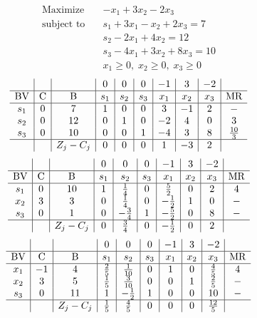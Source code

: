 \documentclass{article}
\begin{document}
\begin{align*}
\text{Maximize} \quad & -x_{1} + 3x_{2} - 2x_{3}\\
\text{subject to} \quad
& s_{1} + 3x_{1} - x_{2} + 2x_{3}=7\\
& s_{2} - 2x_{1} + 4x_{2}=12\\
& s_{3} - 4x_{1} + 3x_{2} + 8x_{3}=10\\
& x_{1}\ge0,\; x_{2}\ge0,\; x_{3}\ge0\end{align*}
\begin{align*}
\begin{array}{c|c|c|c|c|c|c|c|c|c}
 &  &  & 0 & 0 & 0 & -1 & 3 & -2 & \\
\hline
\text{BV} & \text{C} & \text{B} & s_{1} & s_{2} & s_{3} & x_{1} & x_{2} & x_{3} & \text{MR} \\
\hline
s_{1} & 0 & 7 & 1 & 0 & 0 & 3 & -1 & 2 & - \\
s_{2} & 0 & 12 & 0 & 1 & 0 & -2 & 4 & 0 & 3 \\
s_{3} & 0 & 10 & 0 & 0 & 1 & -4 & 3 & 8 & \frac{10}{3} \\
\hline
 &  & Z_j-C_j & 0 & 0 & 0 & 1 & -3 & 2 & \\
\end{array}
\end{align*}
\begin{align*}
\begin{array}{c|c|c|c|c|c|c|c|c|c}
 &  &  & 0 & 0 & 0 & -1 & 3 & -2 & \\
\hline
\text{BV} & \text{C} & \text{B} & s_{1} & s_{2} & s_{3} & x_{1} & x_{2} & x_{3} & \text{MR} \\
\hline
s_{1} & 0 & 10 & 1 & \frac{1}{4} & 0 & \frac{5}{2} & 0 & 2 & 4 \\
x_{2} & 3 & 3 & 0 & \frac{1}{4} & 0 & -\frac{1}{2} & 1 & 0 & - \\
s_{3} & 0 & 1 & 0 & -\frac{3}{4} & 1 & -\frac{5}{2} & 0 & 8 & - \\
\hline
 &  & Z_j-C_j & 0 & \frac{3}{4} & 0 & -\frac{1}{2} & 0 & 2 & \\
\end{array}
\end{align*}
\begin{align*}
\begin{array}{c|c|c|c|c|c|c|c|c|c}
 &  &  & 0 & 0 & 0 & -1 & 3 & -2 & \\
\hline
\text{BV} & \text{C} & \text{B} & s_{1} & s_{2} & s_{3} & x_{1} & x_{2} & x_{3} & \text{MR} \\
\hline
x_{1} & -1 & 4 & \frac{2}{5} & \frac{1}{10} & 0 & 1 & 0 & \frac{4}{5} & 4 \\
x_{2} & 3 & 5 & \frac{1}{5} & \frac{3}{10} & 0 & 0 & 1 & \frac{2}{5} & - \\
s_{3} & 0 & 11 & 1 & -\frac{1}{2} & 1 & 0 & 0 & 10 & - \\
\hline
 &  & Z_j-C_j & \frac{1}{5} & \frac{4}{5} & 0 & 0 & 0 & \frac{12}{5} & \\
\end{array}
\end{align*}
\end{document}
